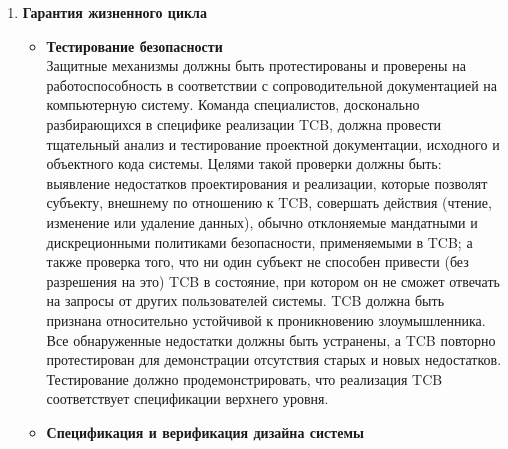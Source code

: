 \begin{enumerate}
\begin{enumerate}
\begin{enumerate}
\begin{enumerate}
\begin{itemize}
					определен, и все элементы TCB должны быть идентифицированы.
					\item{\textbf{Целостность системы}}\\
					Должны быть предусмотрены аппаратные и/или программные средства, могут быть использованы для периодической проверки правильности работы аппаратных и программных элементов TCB.
					\item{\textbf{Анализ скрытых каналов связи}}\\
					Разработчик системы должен провести тщательный поиск скрытых каналов хранения и определить (либо путем фактических измерений, либо путем инженерной оценки)
					максимальную пропускную способность каждого выявленного канала.
					\item{\textbf{Доверенное управление объектами}}\\
					TCB должен поддерживать раздельные функции оператора и администратора системы.
				\end{itemize}
				\item{\textbf{Гарантия жизненного цикла}}
				\begin{itemize}
					\item{\textbf{Тестирование безопасности}}\\
					Защитные механизмы должны быть протестированы и проверены на работоспособность в соответствии с сопроводительной документацией на компьютерную систему.  Команда специалистов,
					досконально разбирающихся в специфике реализации TCB, должна провести тщательный анализ и тестирование проектной документации, исходного и объектного кода системы. Целями такой
					проверки должны быть: выявление недостатков проектирования и реализации, которые позволят субъекту, внешнему по отношению к TCB, совершать действия (чтение, изменение или удаление данных),
					обычно отклоняемые мандатными и дискреционными политиками безопасности, применяемыми в TCB; а также проверка того, что ни один субъект не способен привести (без разрешения на это)
					TCB в состояние, при котором он не сможет отвечать на запросы от других пользователей системы. TCB должна быть признана относительно устойчивой к проникновению злоумышленника.
					Все обнаруженные недостатки должны быть устранены, а TCB повторно протестирован для демонстрации отсутствия старых и новых недостатков. Тестирование должно продемонстрировать,
					что реализация TCB соответствует спецификации верхнего уровня.
					\item{\textbf{Спецификация и верификация дизайна системы}}\\

\end{itemize}
\end{enumerate}
\end{enumerate}
\end{enumerate}
\end{enumerate}
